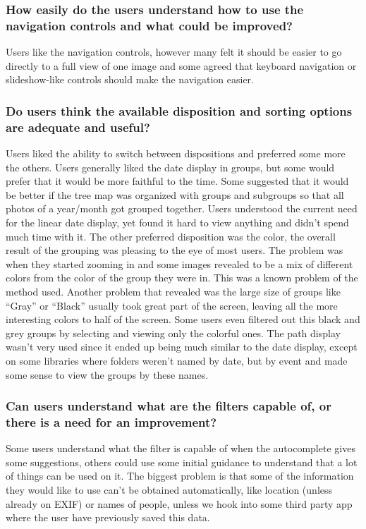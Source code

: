 \subsubsection{How easily do the users understand how to use the navigation controls and what could be improved?}
Users like the navigation controls, however many felt it should be easier to go directly to a full view of one image and some agreed that keyboard navigation or slideshow-like controls should make the navigation easier.




\subsubsection{Do users think the available disposition and sorting options are adequate and useful?}
Users liked the ability to switch between dispositions and preferred some more the others.
Users generally liked the date display in groups, but some would prefer that it would be more faithful to the time. Some suggested that it would be better if the tree map was organized with groups and subgroups so that all photos of a year/month got grouped together. Users understood the current need for the linear date display, yet found it hard to view anything and didn't spend much time with it.
The other preferred disposition was the color, the overall result of the grouping was pleasing to the eye of most users. The problem was when they started zooming in and some images revealed to be a mix of different colors from the color of the group they were in. This was a known problem of the method used. Another problem that revealed was the large size of groups like ``Gray'' or ``Black'' usually took great part of the screen, leaving all the more interesting colors to half of the screen. Some users even filtered out this black and grey groups by selecting and viewing only the colorful ones.
The path display wasn't very used since it ended up being much similar to the date display, except on some libraries where folders weren't named by date, but by event and made some sense to view the groups by these names. 




\subsubsection{Can users understand what are the filters capable of, or there is a need for an improvement?}
Some users understand what the filter is capable of when the autocomplete gives some suggestions, others could use some initial guidance to understand that a lot of things can be used on it. The biggest problem is that some of the information they would like to use can't be obtained automatically, like location (unless already on EXIF) or names of people, unless we hook into some third party app where the user have previously saved this data.




